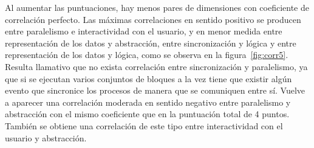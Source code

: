 \documentclass[a4paper, 12pt]{book}
\begin{document}
Al aumentar las puntuaciones, hay menos pares de dimensiones con coeficiente de correlación perfecto. Las máximas correlaciones en sentido positivo se producen entre paralelismo e interactividad con el usuario, y en menor medida entre representación de los datos y abstracción, entre sincronización y lógica y entre representación de los datos y lógica, como se observa en la figura~\ref{fig:corr5}. Resulta llamativo que no exista correlación entre sincronización y paralelismo, ya que si se ejecutan varios conjuntos de bloques a la vez tiene que existir algún evento que sincronice los procesos de manera que se comuniquen entre sí. Vuelve a aparecer una correlación moderada en sentido negativo entre paralelismo y abstracción con el mismo coeficiente que en la puntuación total de 4 puntos. También se obtiene una correlación de este tipo entre interactividad con el usuario y abstracción.%
\end{document}
